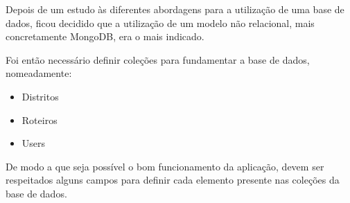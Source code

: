 Depois de um estudo às diferentes abordagens para a utilização de uma base de dados, ficou decidido que a utilização de um modelo não relacional, mais concretamente MongoDB, era o mais indicado.

Foi então necessário definir coleções para fundamentar a base de dados, nomeadamente:
\begin{itemize}
    \item Distritos
    \item Roteiros
    \item Users
\end{itemize}

De modo a que seja possível o bom funcionamento da aplicação, devem ser respeitados alguns campos para definir cada elemento presente nas coleções da base de dados.
